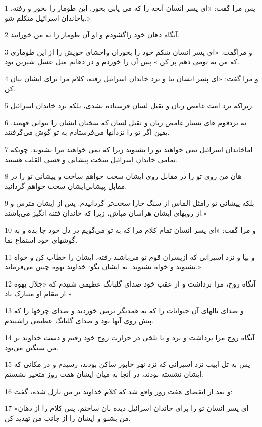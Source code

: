 \par 1 پس مرا گفت: «ای پسر انسان آنچه را که می یابی بخور. این طومار را بخور و رفته، باخاندان اسرائیل متکلم شو.»
\par 2 آنگاه دهان خود راگشودم و او آن طومار را به من خورانید.
\par 3 و مراگفت: «ای پسر انسان شکم خود را بخوران واحشای خویش را از این طوماری که من به تومی دهم پر کن.» پس آن را خوردم و در دهانم مثل عسل شیرین بود.
\par 4 و مرا گفت: «ای پسر انسان بیا و نزد خاندان اسرائیل رفته، کلام مرا برای ایشان بیان کن.
\par 5 زیراکه نزد امت غامض زبان و ثقیل لسان فرستاده نشدی، بلکه نزد خاندان اسرائیل.
\par 6 نه نزدقوم های بسیار غامض زبان و ثقیل لسان که سخنان ایشان را نتوانی فهمید. یقین اگر تو را نزدآنها می‌فرستادم به تو گوش می‌گرفتند.
\par 7 اماخاندان اسرائیل نمی خواهند تو را بشنوند زیرا که نمی خواهند مرا بشنوند. چونکه تمامی خاندان اسرائیل سخت پیشانی و قسی القلب هستند.
\par 8 هان من روی تو را در مقابل روی ایشان سخت خواهم ساخت و پیشانی تو را در مقابل پیشانی‌ایشان سخت خواهم گردانید.
\par 9 بلکه پیشانی تو رامثل الماس از سنگ خارا سخت‌تر گردانیدم. پس از ایشان مترس و از رویهای ایشان هراسان مباش، زیرا که خاندان فتنه انگیز می‌باشند.»
\par 10 و مرا گفت: «ای پسر انسان تمام کلام مرا که به تو می‌گویم در دل خود جا بده و به گوشهای خود استماع نما.
\par 11 و بیا و نزد اسیرانی که ازپسران قوم تو می‌باشند رفته، ایشان را خطاب کن و خواه بشنوند و خواه نشنوند. به ایشان بگو: خداوند یهوه چنین می‌فرماید.»
\par 12 آنگاه روح، مرا برداشت و از عقب خود صدای گلبانگ عظیمی شنیدم که «جلال یهوه از مقام او متبارک باد.»
\par 13 و صدای بالهای آن حیوانات را که به همدیگر برمی خوردند و صدای چرخها را که پیش روی آنها بود و صدای گلبانگ عظیمی راشنیدم.
\par 14 آنگاه روح مرا برداشت و برد و با تلخی در حرارت روح خود رفتم و دست خداوند بر من سنگین می‌بود.
\par 15 پس به تل ابیب نزد اسیرانی که نزد نهر خابور ساکن بودند، رسیدم و در مکانی که ایشان نشسته بودند، در آنجا به میان ایشان هفت روز متحیر نشستم.
\par 16 و بعد از انقضای هفت روز واقع شد که کلام خداوند بر من نازل شده، گفت:
\par 17 «ای پسر انسان تو را برای خاندان اسرائیل دیده بان ساختم، پس کلام را از دهان من بشنو و ایشان را از جانب من تهدید کن.

